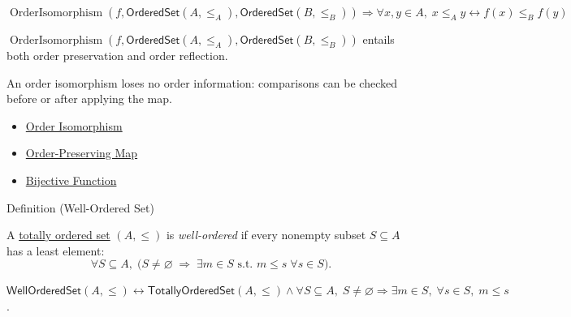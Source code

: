 \begin{remark*}
\[
  \operatorname{OrderIsomorphism}(f,\mathsf{OrderedSet}(A,\leq_A),
  \mathsf{OrderedSet}(B,\leq_B))\Rightarrow
  \forall x,y\in A,\;x\leq_A y\leftrightarrow f(x)\leq_B f(y)
\]
\end{remark*}



\begin{remark*}[Interpretation]
$\operatorname{OrderIsomorphism}(f,\mathsf{OrderedSet}(A,\leq_A),
\mathsf{OrderedSet}(B,\leq_B))$ entails both order preservation and order
reflection.

An order isomorphism loses no order information: comparisons can be checked
before or after applying the map.
\end{remark*}

\begin{dependencies}
\begin{itemize}
  \item \hyperref[def:order-isomorphism-ordered-sets]{Order Isomorphism}
  \item \hyperref[def:order-preserving-map-ordered-sets]{Order-Preserving Map}
  \item \hyperref[def:bijective]{Bijective Function}
\end{itemize}
\end{dependencies}

\begin{definitionbox}{Definition (Well-Ordered Set)}
\begin{definition}\label{def:well-ordered-set}
A \hyperref[def:totally-ordered-set]{totally ordered set} $(A,\leq)$ is
\emph{well-ordered} if every nonempty subset $S \subseteq A$ has a least
element:
\[
\forall S \subseteq A,\;
\bigl(S \neq \varnothing \;\Rightarrow\; \exists m \in S \text{ s.t.\ }
m \leq s \;\forall s \in S\bigr).
\]
\end{definition}
\end{definitionbox}

\begin{remark*}
$\mathsf{WellOrderedSet}(A,\leq)\leftrightarrow
\mathsf{TotallyOrderedSet}(A,\leq)\wedge
\forall S\subseteq A,\; S\neq\varnothing\Rightarrow
\exists m\in S,\;\forall s\in S,\;m\leq s$.
\end{remark*}

